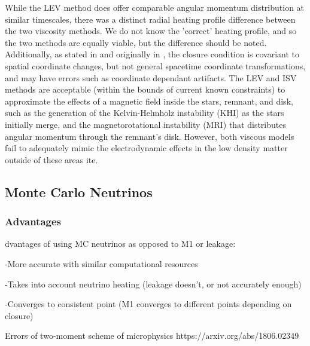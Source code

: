 \documentclass[%
twocolumn,
superscriptaddress,
nofootinbib,
 amsmath,amssymb,
 aps, prd
]{revtex4-2}
\newcommand{\alex}[1]{\color{red}{#1}}
\begin{document}
       While the LEV method does offer comparable angular momentum distribution at similar timescales, there was a distinct radial heating profile difference between the two viscosity methods.
       We do not know the 'correct' heating profile, and so the two methods are equally viable, but the difference should be noted.
       Additionally, as stated in \cite{Duez_2020} and originally in \cite{Radice_2017}, the closure condition is covariant to spatial coordinate changes, but not general spacetime coordinate transformations, and may have errors such as coordinate dependant artifacts.
       The LEV and ISV methods are acceptable (within the bounds of current known constraints) to approximate the effects of a magnetic field inside the stars, remnant, and disk, such as the generation of the Kelvin-Helmholz instability (KHI) as the stars initially merge, and the magnetorotational instability (MRI) that distributes angular momentum through the remnant's disk.
       However, both viscous models fail to adequately mimic the electrodynamic effects in the low density matter outside of these areas {\alex cite}.

  \subsection{Monte Carlo Neutrinos}
      \subsubsection{Advantages}
      {\alex

        Advantages of using MC neutrinos as opposed to M1 or leakage:

          -More accurate with similar computational resources

          -Takes into account neutrino heating (leakage doesn't, or not accurately enough)

          -Converges to consistent point (M1 converges to different points depending on closure)

          Errors of two-moment scheme of microphysics https://arxiv.org/abs/1806.02349
          }
\end{document}
